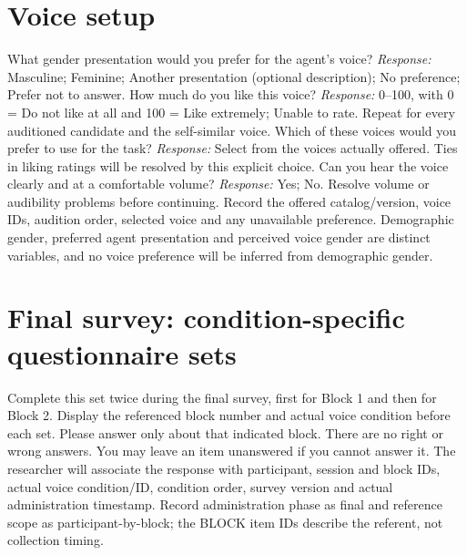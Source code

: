 \section{Voice setup}
What gender presentation would you prefer for the agent's voice?
\textit{Response:} Masculine; Feminine; Another presentation (optional description); No preference; Prefer not to answer.
How much do you like this voice?
\textit{Response:} 0--100, with 0 = Do not like at all and 100 = Like extremely; Unable to rate. Repeat for every auditioned candidate and the self-similar voice.
Which of these voices would you prefer to use for the task?
\textit{Response:} Select from the voices actually offered. Ties in liking ratings will be resolved by this explicit choice.
Can you hear the voice clearly and at a comfortable volume?
\textit{Response:} Yes; No. Resolve volume or audibility problems before continuing.
Record the offered catalog/version, voice IDs, audition order, selected voice and any unavailable preference. Demographic gender, preferred agent presentation and perceived voice gender are distinct variables, and no voice preference will be inferred from demographic gender.
\clearpage\section{Final survey: condition-specific questionnaire sets}
Complete this set twice during the final survey, first for Block 1 and then for Block 2. Display the referenced block number and actual voice condition before each set. Please answer only about that indicated block. There are no right or wrong answers. You may leave an item unanswered if you cannot answer it.
The researcher will associate the response with participant, session and block IDs, actual voice condition/ID, condition order, survey version and actual administration timestamp. Record administration phase as final and reference scope as participant-by-block; the BLOCK item IDs describe the referent, not collection timing.

